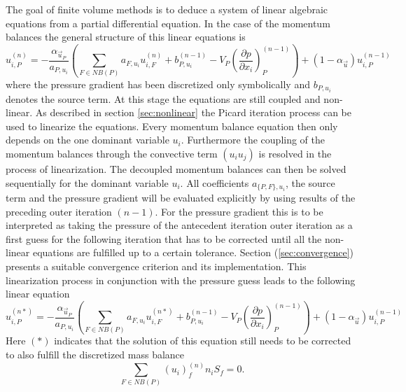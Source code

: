   The goal of finite volume methods is to deduce a system of linear algebraic equations from a partial differential equation. In the case of the momentum balances the general structure of this linear equations is
  \begin{equation}
    \label{eq:linfinal}
    u_{i,P}^{(n)} 
    = 
    - \frac{\alpha_{\vec{u}_P}}{a_{P,u_i}} \left(\sum_{F \in NB(P)} a_{F,u_i} u_{i,F}^{(n)}
    +                                     b_{P,u_i}^{(n-1)} 
    -                                     V_P\left(\frac{\partial p}{\partial x_i}\right)_P^{(n-1)} \right)
    + \left(1 - \alpha_{\vec{u}}\right) u_{i,P}^{(n-1)}  
  \end{equation}
  where the pressure gradient has been discretized only symbolically and \(b_{P,u_i}\) denotes the source term. At this stage the equations are still coupled and non-linear. As described in section \ref{sec:nonlinear} the Picard iteration process can be used to linearize the equations. Every momentum balance equation then only depends on the one dominant variable \(u_i\). Furthermore the coupling of the momentum balances through the convective term \((u_i u_j)\) is resolved in the process of linearization. The decoupled momentum balances can then be solved sequentially for the dominant variable \(u_i\). All coefficients \(a_{\{P,F\},u_i}\), the source term and the pressure gradient will be evaluated explicitly by using results of the preceding outer iteration \((n-1)\). For the pressure gradient this is to be interpreted as taking the pressure of the antecedent iteration outer iteration as a first guess for the following iteration that has to be corrected until all the non-linear equations are fulfilled up to a certain tolerance. Section (\ref{sec:convergence}) presents a suitable convergence criterion and its implementation. This linearization process in conjunction with the pressure guess leads to the following linear equation 
  \begin{equation}
    \label{eq:nodeinter}
    u_{i,P}^{(n*)} 
    = 
    - \frac{\alpha_{\vec{u}_P}}{a_{P,u_i}} \left(\sum_{F \in NB(P)} a_{F,u_i} u_{i,F}^{(n*)}
    +                                     b_{P,u_i}^{(n-1)} 
    -                                     V_P\left(\frac{\partial p}{\partial x_i}\right)_P^{(n-1)} \right)
    + \left(1 - \alpha_{\vec{u}}\right) u_{i,P}^{(n-1)}  
\end{equation}
Here \((*)\) indicates that the solution of this equation still needs to be corrected to also fulfill the discretized mass balance
  \begin{equation}
    \label{eq:contisemi}
    \sum_{F \in NB(P)} \left(u_i\right)^{(n)}_f n_i S_f = 0.
  \end{equation}

